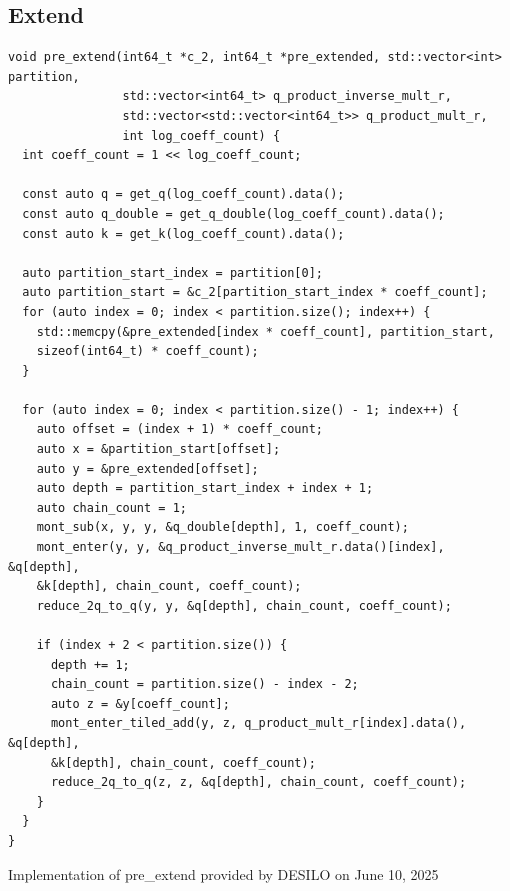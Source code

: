 \documentclass[../../fheimpl.tex]{subfiles}
\begin{document}
	\subsection{Extend}
	\begin{listing}
		\begin{verbatim}
void pre_extend(int64_t *c_2, int64_t *pre_extended, std::vector<int> partition,
                std::vector<int64_t> q_product_inverse_mult_r,
                std::vector<std::vector<int64_t>> q_product_mult_r,
                int log_coeff_count) {
  int coeff_count = 1 << log_coeff_count;
	
  const auto q = get_q(log_coeff_count).data();
  const auto q_double = get_q_double(log_coeff_count).data();
  const auto k = get_k(log_coeff_count).data();
	
  auto partition_start_index = partition[0];
  auto partition_start = &c_2[partition_start_index * coeff_count];
  for (auto index = 0; index < partition.size(); index++) {
    std::memcpy(&pre_extended[index * coeff_count], partition_start,
    sizeof(int64_t) * coeff_count);
  }
	
  for (auto index = 0; index < partition.size() - 1; index++) {
    auto offset = (index + 1) * coeff_count;
    auto x = &partition_start[offset];
    auto y = &pre_extended[offset];
    auto depth = partition_start_index + index + 1;
    auto chain_count = 1;
    mont_sub(x, y, y, &q_double[depth], 1, coeff_count);
    mont_enter(y, y, &q_product_inverse_mult_r.data()[index], &q[depth],
    &k[depth], chain_count, coeff_count);
    reduce_2q_to_q(y, y, &q[depth], chain_count, coeff_count);
		
    if (index + 2 < partition.size()) {
      depth += 1;
      chain_count = partition.size() - index - 2;
      auto z = &y[coeff_count];
      mont_enter_tiled_add(y, z, q_product_mult_r[index].data(), &q[depth],
      &k[depth], chain_count, coeff_count);
      reduce_2q_to_q(z, z, &q[depth], chain_count, coeff_count);
    }
  }
}
		\end{verbatim}
		\caption{Implementation of \textsf{pre\_extend} provided by DESILO on June 10, 2025}
		\label{alg:preextend}
	\end{listing}
	
\end{document}
